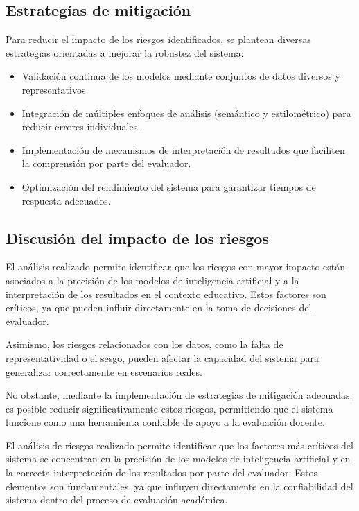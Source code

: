 \subsection{Estrategias de mitigación}

Para reducir el impacto de los riesgos identificados, se plantean diversas estrategias orientadas a mejorar la robustez del sistema:

\begin{itemize}
	\item Validación continua de los modelos mediante conjuntos de datos diversos y representativos.
	\item Integración de múltiples enfoques de análisis (semántico y estilométrico) para reducir errores individuales.
	\item Implementación de mecanismos de interpretación de resultados que faciliten la comprensión por parte del evaluador.
	\item Optimización del rendimiento del sistema para garantizar tiempos de respuesta adecuados.
\end{itemize}

\subsection{Discusión del impacto de los riesgos}

El análisis realizado permite identificar que los riesgos con mayor impacto están asociados a la precisión de los modelos de inteligencia artificial y a la interpretación de los resultados en el contexto educativo. Estos factores son críticos, ya que pueden influir directamente en la toma de decisiones del evaluador.

Asimismo, los riesgos relacionados con los datos, como la falta de representatividad o el sesgo, pueden afectar la capacidad del sistema para generalizar correctamente en escenarios reales.

No obstante, mediante la implementación de estrategias de mitigación adecuadas, es posible reducir significativamente estos riesgos, permitiendo que el sistema funcione como una herramienta confiable de apoyo a la evaluación docente.



El análisis de riesgos realizado permite identificar que los factores más críticos del sistema se concentran en la precisión de los modelos de inteligencia artificial y en la correcta interpretación de los resultados por parte del evaluador. Estos elementos son fundamentales, ya que influyen directamente en la confiabilidad del sistema dentro del proceso de evaluación académica.

